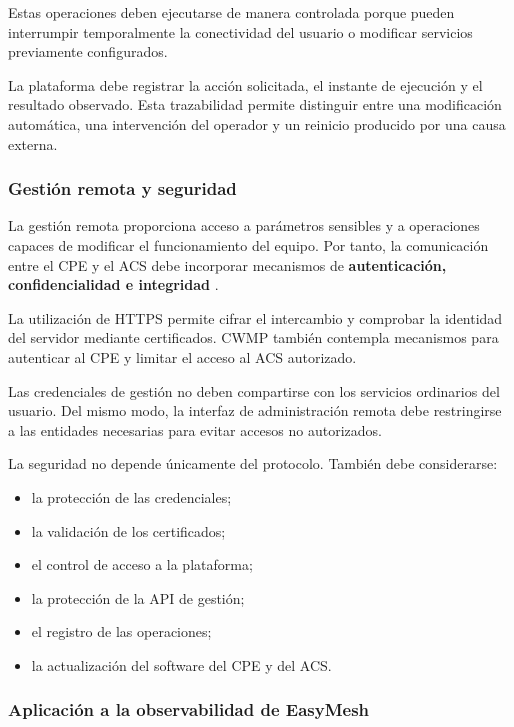 Estas operaciones deben ejecutarse de manera controlada porque pueden
interrumpir temporalmente la conectividad del usuario o modificar
servicios previamente configurados.

La plataforma debe registrar la acción solicitada, el instante de
ejecución y el resultado observado. Esta trazabilidad permite distinguir
entre una modificación automática, una intervención del operador y un
reinicio producido por una causa externa.


\subsubsection*{Gestión remota y seguridad}

La gestión remota proporciona acceso a parámetros sensibles y a
operaciones capaces de modificar el funcionamiento del equipo. Por tanto,
la comunicación entre el CPE y el ACS debe incorporar mecanismos de
\textbf{autenticación, confidencialidad e integridad}
\cite{bbf_tr069}.

La utilización de HTTPS permite cifrar el intercambio y comprobar la
identidad del servidor mediante certificados. CWMP también contempla
mecanismos para autenticar al CPE y limitar el acceso al ACS autorizado.

Las credenciales de gestión no deben compartirse con los servicios
ordinarios del usuario. Del mismo modo, la interfaz de administración
remota debe restringirse a las entidades necesarias para evitar accesos
no autorizados.

La seguridad no depende únicamente del protocolo. También debe
considerarse:

\begin{itemize}
    \item la protección de las credenciales;
    \item la validación de los certificados;
    \item el control de acceso a la plataforma;
    \item la protección de la API de gestión;
    \item el registro de las operaciones;
    \item la actualización del software del CPE y del ACS.
\end{itemize}


\subsubsection*{Aplicación a la observabilidad de EasyMesh}


